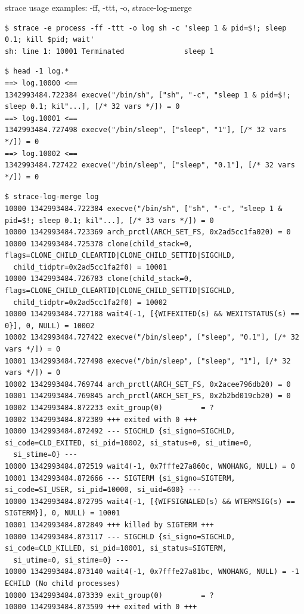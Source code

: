 \documentclass[unicode]{beamer}
\begin{document}
\begin{frame}[fragile]{strace usage examples: -ff, -ttt, -o, strace-log-merge}
\Tiny
\begin{verbatim}
$ strace -e process -ff -ttt -o log sh -c 'sleep 1 & pid=$!; sleep 0.1; kill $pid; wait'
sh: line 1: 10001 Terminated              sleep 1
\end{verbatim}

\begin{verbatim}
$ head -1 log.*
==> log.10000 <==
1342993484.722384 execve("/bin/sh", ["sh", "-c", "sleep 1 & pid=$!; sleep 0.1; kil"...], [/* 32 vars */]) = 0
==> log.10001 <==
1342993484.727498 execve("/bin/sleep", ["sleep", "1"], [/* 32 vars */]) = 0
==> log.10002 <==
1342993484.727422 execve("/bin/sleep", ["sleep", "0.1"], [/* 32 vars */]) = 0
\end{verbatim}

\begin{verbatim}
$ strace-log-merge log
10000 1342993484.722384 execve("/bin/sh", ["sh", "-c", "sleep 1 & pid=$!; sleep 0.1; kil"...], [/* 33 vars */]) = 0
10000 1342993484.723369 arch_prctl(ARCH_SET_FS, 0x2ad5cc1fa020) = 0
10000 1342993484.725378 clone(child_stack=0, flags=CLONE_CHILD_CLEARTID|CLONE_CHILD_SETTID|SIGCHLD,
  child_tidptr=0x2ad5cc1fa2f0) = 10001
10000 1342993484.726783 clone(child_stack=0, flags=CLONE_CHILD_CLEARTID|CLONE_CHILD_SETTID|SIGCHLD,
  child_tidptr=0x2ad5cc1fa2f0) = 10002
10000 1342993484.727188 wait4(-1, [{WIFEXITED(s) && WEXITSTATUS(s) == 0}], 0, NULL) = 10002
10002 1342993484.727422 execve("/bin/sleep", ["sleep", "0.1"], [/* 32 vars */]) = 0
10001 1342993484.727498 execve("/bin/sleep", ["sleep", "1"], [/* 32 vars */]) = 0
10002 1342993484.769744 arch_prctl(ARCH_SET_FS, 0x2acee796db20) = 0
10001 1342993484.769845 arch_prctl(ARCH_SET_FS, 0x2b2bd019cb20) = 0
10002 1342993484.872233 exit_group(0)         = ?
10002 1342993484.872389 +++ exited with 0 +++
10000 1342993484.872492 --- SIGCHLD {si_signo=SIGCHLD, si_code=CLD_EXITED, si_pid=10002, si_status=0, si_utime=0,
  si_stime=0} ---
10000 1342993484.872519 wait4(-1, 0x7fffe27a860c, WNOHANG, NULL) = 0
10001 1342993484.872666 --- SIGTERM {si_signo=SIGTERM, si_code=SI_USER, si_pid=10000, si_uid=600} ---
10000 1342993484.872795 wait4(-1, [{WIFSIGNALED(s) && WTERMSIG(s) == SIGTERM}], 0, NULL) = 10001
10001 1342993484.872849 +++ killed by SIGTERM +++
10000 1342993484.873117 --- SIGCHLD {si_signo=SIGCHLD, si_code=CLD_KILLED, si_pid=10001, si_status=SIGTERM,
  si_utime=0, si_stime=0} ---
10000 1342993484.873140 wait4(-1, 0x7fffe27a81bc, WNOHANG, NULL) = -1 ECHILD (No child processes)
10000 1342993484.873339 exit_group(0)         = ?
10000 1342993484.873599 +++ exited with 0 +++
\end{verbatim}
\end{frame}
\end{document}
